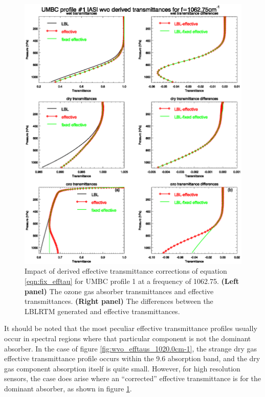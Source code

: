 \begin{figure}[htp]
  \centering
  \includegraphics[bb=70 122 540 302,clip,scale=0.8]{graphics/wvo_efftaus_1062.75cm-1.eps}
  \caption{Impact of  derived effective transmittance corrections of equation \ref{eqn:fix_efftau} for UMBC profile 1 at a frequency of 1062.75\invcm. \textbf{(Left panel)} The ozone gas absorber transmittances and effective transmittances. \textbf{(Right panel)} The differences between the LBLRTM generated and effective transmittances.}
  \label{fig:wvo_efftaus_1062.75cm-1}
\end{figure}

It should be noted that the most peculiar effective transmittance profiles usually occur in spectral regions where that particular component is not the dominant absorber. In the case of figure \ref{fig:wvo_efftaus_1020.0cm-1}, the strange dry gas effective transmittance profile occurs within the 9.6\micron{} \ozone{} absorption band, and the dry gas component absorption itself is quite small. However, for high resolution sensors, the case does arise where an ``corrected'' effective transmittance is for the dominant absorber, as shown in figure \ref{fig:wvo_efftaus_1062.75cm-1}.

